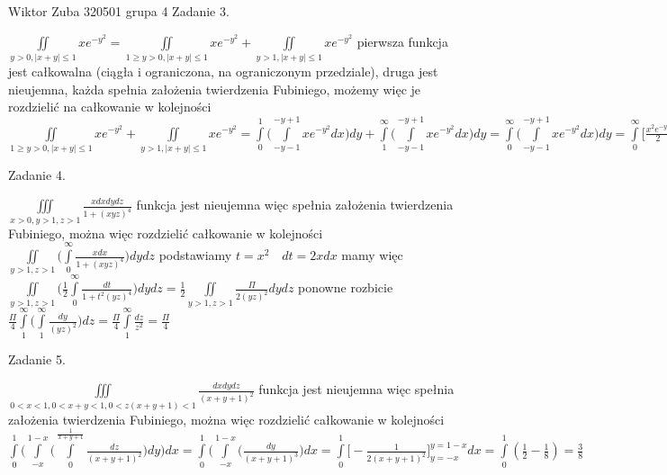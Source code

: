 \documentclass{article}
\begin{document}
Wiktor Zuba 320501 grupa 4
\newline
Zadanie 3.
\newline



$
\iint\limits_{y>0,|x+y|\le 1}xe^{-y^{2}}
=
\iint\limits_{1\ge y>0,|x+y|\le 1}xe^{-y^{2}}
+
\iint\limits_{y>1,|x+y|\le 1}xe^{-y^{2}}
$
pierwsza funkcja jest całkowalna (ciągła i ograniczona, na ograniczonym przedziale), druga jest nieujemna,
każda spełnia założenia twierdzenia Fubiniego, możemy więc je rozdzielić na całkowanie w kolejności
$
\iint\limits_{1\ge y>0,|x+y|\le 1}xe^{-y^{2}}
+\iint\limits_{y>1,|x+y|\le 1}xe^{-y^{2}}
=
\int\limits_{0}^{1}
\bigl(
\int\limits_{-y-1}^{-y+1}
xe^{-y^{2}} dx
\bigr) dy
+
\int\limits_{1}^{\infty}
\bigl(
\int\limits_{-y-1}^{-y+1}
xe^{-y^{2}} dx
\bigr) dy
=
\int\limits_{0}^{\infty}
\bigl(
\int\limits_{-y-1}^{-y+1}
xe^{-y^{2}} dx
\bigr) dy
=
\int\limits_{0}^{\infty}
\bigl[
\frac{x^2 e^{-y^{2}}}{2}
\bigr]_{-y-1}^{-y+1} dy
=
\int\limits_{0}^{\infty} -2ye^{-y^{2}} dy
=
\bigl[
e^{-y^2}
\bigr]_{0}^{\infty}
=
-1
$
\newline
\newline




Zadanie 4.
\newline




$
\iiint\limits_{x>0,y>1,z>1} \frac{x dx dy dz}{1+(xyz)^4}
$
funkcja jest nieujemna więc spełnia założenia twierdzenia Fubiniego, można więc rozdzielić całkowanie w kolejności
\newline
$
\iint\limits_{y>1,z>1} \bigl(
\int\limits_{0}^{\infty} \frac{x dx}{1+(xyz)^4}
\bigr) dy dz
$
podstawiamy
$
t=x^2 \quad dt=2xdx
$
mamy więc
$
\iint\limits_{y>1,z>1} \bigl(
\frac{1}{2}\int\limits_{0}^{\infty} \frac{dt}{1+t^2 (yz)^4}
\bigr) dy dz
=
\frac{1}{2}\iint\limits_{y>1,z>1}
\frac{\Pi}{2 (yz)^2} dy dz
$
ponowne rozbicie
$
\frac{\Pi}{4}
\int\limits_{1}^{\infty} \bigl(
\int\limits_{1}^{\infty}
\frac{dy}{(yz)^2}
\bigr) dz
=
\frac{\Pi}{4}
\int\limits_{1}^{\infty}
\frac{dz}{z^2}
=
\frac{\Pi}{4}
$
\newline
\newline




Zadanie 5.
\newline



$
\iiint\limits_{0<x<1,0<x+y<1,0<z(x+y+1)<1} \frac{dx dy dz}{(x+y+1)^2}
$
funkcja jest nieujemna więc spełnia założenia twierdzenia Fubiniego, można więc rozdzielić całkowanie w kolejności
$
\int\limits_{0}^{1} \bigl(
\int\limits_{-x}^{1-x} \bigl(
\int\limits_{0}^{\frac{1}{x+y+1}}
\frac{dz}{(x+y+1)^2}
\bigr) dy
\bigr) dx
=
\int\limits_{0}^{1} \bigl(
\int\limits_{-x}^{1-x} \bigl(
\frac{dy}{(x+y+1)^3}
\bigr) dx
=
\int\limits_{0}^{1} \bigl[
- \frac{1}{2(x+y+1)^2}
\bigr]_{y=-x}^{y=1-x} dx
=
\int\limits_{0}^{1} (\frac{1}{2}-\frac{1}{8})
=
\frac{3}{8}
$
\end{document}

